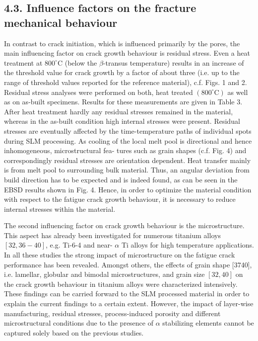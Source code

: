 \documentclass[10pt]{article}
\begin{document}
\subsection*{4.3. Influence factors on the fracture mechanical behaviour}
In contrast to crack initiation, which is influenced primarily by the pores, the main influencing factor on crack growth behaviour is residual stress. Even a heat treatment at $800^{\circ} \mathrm{C}$ (below the $\beta$-transus temperature) results in an increase of the threshold value for crack growth by a factor of about three (i.e. up to the range of threshold values reported for the reference material), c.f. Figs. 1 and 2. Residual stress analyses were performed on both, heat treated $\left(800^{\circ} \mathrm{C}\right)$ as well as on as-built specimens. Results for these measurements are given in Table 3. After heat treatment hardly any residual stresses remained in the material, whereas in the as-built condition high internal stresses were present. Residual stresses are eventually affected by the time-temperature paths of individual spots during SLM processing. As cooling of the local melt pool is directional and hence inhomogeneous, microstructural fea- tures such as grain shapes (c.f. Fig. 4) and correspondingly residual stresses are orientation dependent. Heat transfer mainly is from melt pool to surrounding bulk material. Thus, an angular deviation from build direction has to be expected and is indeed found, as can be seen in the EBSD results shown in Fig. 4. Hence, in order to optimize the material condition with respect to the fatigue crack growth behaviour, it is necessary to reduce internal stresses within the material.

The second influencing factor on crack growth behaviour is the microstructure. This aspect has already been investigated for numerous titanium alloys $[32,36-40]$, e.g. Ti-6-4 and near- $\alpha$ Ti alloys for high temperature applications. In all these studies the strong impact of microstructure on the fatigue crack performance has been revealed. Amongst others, the effects of grain shape [3740], i.e. lamellar, globular and bimodal microstructures, and grain size $[32,40]$ on the crack growth behaviour in titanium alloys were characterized intensively. These findings can be carried forward to the SLM processed material in order to explain the current findings to a certain extent. However, the impact of layer-wise manufacturing, residual stresses, process-induced porosity and different microstructural conditions due to the presence of $\alpha$ stabilizing elements cannot be captured solely based on the previous studies.
\end{document}
